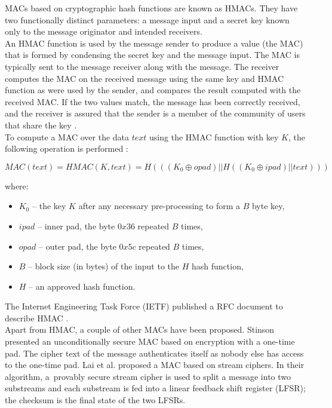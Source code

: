 MACs based on cryptographic hash functions are known as HMACs. They have two
functionally distinct parameters: a message input and a secret key known only
to the message originator and intended receivers.\\

An HMAC function is used by the message sender to produce a value (the MAC)
that is formed by condensing the secret key and the message input. The MAC is
typically sent to the message receiver along with the message. The receiver
computes the MAC on the received message using the same key and HMAC function
as were used by the sender, and compares the result computed with the received
MAC. If the two values match, the message has been correctly received, and the
receiver is assured that the sender is a member of the community of users that
share the key \cite{nist-hmac}.\\

To compute a MAC over the data $text$ using the HMAC function with key $K$, the
following operation is performed \cite{nist-hmac}:

\begin{equation}
	MAC(text) = HMAC(K, text) = H(((K_{0} \oplus opad)||H((K_{0} \oplus ipad) || text)))
\end{equation}

where:

\begin{itemize}
	\item \textbf{$K_{0}$} -- the key $K$ after any necessary pre-processing to
	form a $B$ byte key,
	\item \textbf{$ipad$} -- inner pad, the byte $0x36$ repeated $B$ times,
	\item \textbf{$opad$} -- outer pad, the byte $0x5c$ repeated $B$ times,
	\item \textbf{$B$} -- block size (in bytes) of the input to the $H$ hash function,
	\item \textbf{$H$} -- an approved hash function.
\end{itemize}

The Internet Engineering Task Force (IETF) published a RFC document to describe
HMAC \cite{rfc2104}.\\

Apart from HMAC, a couple of other MACs have been proposed. Stinson
\cite{unconditional-mac} presented an unconditionally secure MAC based on 
encryption with a one-time pad. The cipher text of the message authenticates
itself as nobody else has access to the one-time pad. Lai et al.
\cite{stream-mac} proposed a MAC based on stream ciphers. In their algorithm,
a~provably secure stream cipher is used to split a message into two substreams
and each substream is fed into a linear feedback shift register (LFSR); the
checksum is the final state of the two LFSRs.\\

